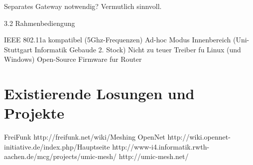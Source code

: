 Separates Gateway notwendig? Vermutlich sinnvoll. 

3.2 Rahmenbediengung

IEEE 802.11a kompatibel (5Ghz-Frequenzen) 
Ad-hoc Modus 
Innenbereich (Uni-Stuttgart Informatik Gebaude 2. Stock) 
Nicht zu teuer 
Treiber fu Linux (und Windows) 
Open-Source Firmware fur Router 

\section{Existierende Losungen und Projekte}

FreiFunk http://freifunk.net/wiki/Meshing 
OpenNet http://wiki.opennet-initiative.de/index.php/Hauptseite 
http://www-i4.informatik.rwth-aachen.de/mcg/projects/umic-mesh/ 
http://umic-mesh.net/
